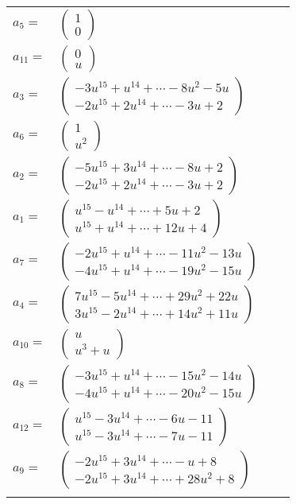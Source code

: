 \documentclass[1p]{elsarticle_modified}
\theoremstyle{definition}
\begin{document}
\begin{tabular}{m{7pt} m{180pt} m{7pt} m{180pt} }
\flushright $a_{5}=$&$\begin{pmatrix}1\\0\end{pmatrix}$ \\
\flushright $a_{11}=$&$\begin{pmatrix}0\\u\end{pmatrix}$ \\
\flushright $a_{3}=$&$\begin{pmatrix}-3 u^{15}+u^{14}+\cdots-8 u^2-5 u\\-2 u^{15}+2 u^{14}+\cdots-3 u+2\end{pmatrix}$ \\
\flushright $a_{6}=$&$\begin{pmatrix}1\\u^2\end{pmatrix}$ \\
\flushright $a_{2}=$&$\begin{pmatrix}-5 u^{15}+3 u^{14}+\cdots-8 u+2\\-2 u^{15}+2 u^{14}+\cdots-3 u+2\end{pmatrix}$ \\
\flushright $a_{1}=$&$\begin{pmatrix}u^{15}- u^{14}+\cdots+5 u+2\\u^{15}+u^{14}+\cdots+12 u+4\end{pmatrix}$ \\
\flushright $a_{7}=$&$\begin{pmatrix}-2 u^{15}+u^{14}+\cdots-11 u^2-13 u\\-4 u^{15}+u^{14}+\cdots-19 u^2-15 u\end{pmatrix}$ \\
\flushright $a_{4}=$&$\begin{pmatrix}7 u^{15}-5 u^{14}+\cdots+29 u^2+22 u\\3 u^{15}-2 u^{14}+\cdots+14 u^2+11 u\end{pmatrix}$ \\
\flushright $a_{10}=$&$\begin{pmatrix}u\\u^3+u\end{pmatrix}$ \\
\flushright $a_{8}=$&$\begin{pmatrix}-3 u^{15}+u^{14}+\cdots-15 u^2-14 u\\-4 u^{15}+u^{14}+\cdots-20 u^2-15 u\end{pmatrix}$ \\
\flushright $a_{12}=$&$\begin{pmatrix}u^{15}-3 u^{14}+\cdots-6 u-11\\u^{15}-3 u^{14}+\cdots-7 u-11\end{pmatrix}$ \\
\flushright $a_{9}=$&$\begin{pmatrix}-2 u^{15}+3 u^{14}+\cdots- u+8\\-2 u^{15}+3 u^{14}+\cdots+28 u^2+8\end{pmatrix}$\\&\end{tabular}
\end{document}
